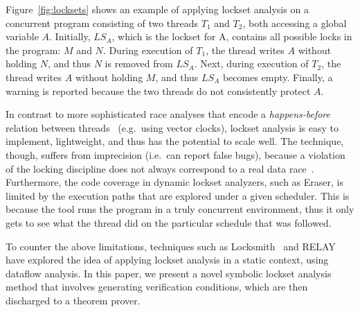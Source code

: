 Figure~\ref{fig:locksets} shows an example of applying lockset analysis on a concurrent program consisting of two threads $T_1$ and $T_2$, both accessing a global variable $A$. Initially, $\mathit{LS}_A$, which is the lockset for A, contains all possible locks in the program: $M$ and $N$. During execution of $T_1$, the thread writes $A$ without holding $N$, and thus $N$ is removed from $\mathit{LS}_A$. Next, during execution of $T_2$, the thread writes $A$ without holding $M$, and thus $\mathit{LS}_A$ becomes empty. Finally, a warning is reported because the two threads do not consistently protect $A$.

In contrast to more sophisticated race analyses that encode a \emph{happens-before} relation between threads~\cite{TODO} (e.g.\ using vector clocks), lockset analysis is easy to implement, lightweight, and thus has the potential to scale well.  The technique, though, suffers from imprecision (i.e.\ can report false bugs), because a violation of the locking discipline does not always correspond to a real data race~\cite{savage1997eraser, pozniansky2003efficient, o2003hybrid, elmas2007goldilocks, flanagan2009fasttrack}. Furthermore, the code coverage in dynamic lockset analyzers, such as Eraser, is limited by the execution paths that are explored under a given scheduler. This is because the tool runs the program in a truly concurrent environment, thus it only gets to see what the thread did on the particular schedule that was followed.

To counter the above limitations, techniques such as Locksmith~\cite{pratikakis2006locksmith} and RELAY~\cite{voung2007relay} have explored the idea of applying lockset analysis in a static context, using dataflow analysis. In this paper, we present a novel symbolic lockset analysis method that involves generating verification conditions, which are then discharged to a theorem prover.
